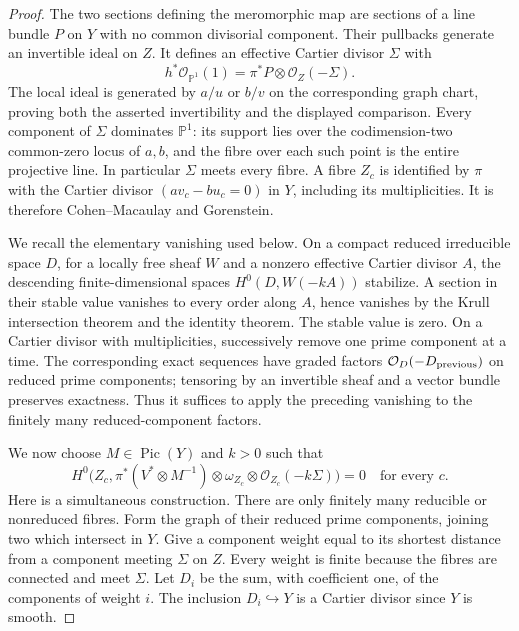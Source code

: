 \begin{proof}
The two sections defining the meromorphic map are sections of a line
bundle $P$ on $Y$ with no common divisorial component. Their pullbacks
generate an invertible ideal on $Z$. It defines an effective Cartier
divisor $\Sigma$ with
\begin{equation}\label{cdp:eq:E-graph-pencil}
 h^*\mathcal O_{\mathbb P^1}(1)=\pi^*P\otimes\mathcal O_Z(-\Sigma).
\end{equation}
The local ideal is generated by $a/u$ or $b/v$ on the corresponding
graph chart, proving both the asserted invertibility and the displayed
comparison. Every component of $\Sigma$ dominates $\mathbb P^1$:
its support lies over the codimension-two common-zero locus of $a,b$,
and the fibre over each such point is the entire projective line.
In particular $\Sigma$ meets every fibre. A fibre $Z_c$ is identified
by $\pi$ with the Cartier divisor $(a v_c-bu_c=0)$ in $Y$, including
its multiplicities. It is therefore Cohen--Macaulay and Gorenstein.

We recall the elementary vanishing used below. On a compact reduced
irreducible space $D$, for a locally free sheaf $W$ and a nonzero
effective Cartier divisor $A$, the descending finite-dimensional
spaces $H^0(D,W(-kA))$ stabilize. A section in their stable value
vanishes to every order along $A$, hence vanishes by the Krull
intersection theorem and the identity theorem. The stable value is
zero. On a Cartier divisor with multiplicities, successively remove
one prime component at a time. The corresponding exact sequences
have graded factors $\mathcal O_D(-D_{\rm previous})$ on reduced prime
components; tensoring by an invertible sheaf and a vector bundle
preserves exactness. Thus it suffices to apply the preceding vanishing
to the finitely many reduced-component factors.

We now choose $M\in\operatorname{Pic}(Y)$ and $k>0$ such that
\begin{equation}\label{cdp:eq:E-all-fibres}
 H^0\bigl(Z_c,\pi^*(V^*\otimes M^{-1})\otimes
       \omega_{Z_c}\otimes\mathcal O_{Z_c}(-k\Sigma)\bigr)=0
 \quad\text{for every }c.
\end{equation}
Here is a simultaneous construction. There are only finitely many
reducible or nonreduced fibres. Form the graph of their reduced prime
components, joining two which intersect in $Y$. Give a component
weight equal to its shortest distance from a component meeting
$\Sigma$ on $Z$. Every weight is finite because the fibres are
connected and meet $\Sigma$. Let $D_i$ be the sum, with coefficient
one, of the components of weight $i$. The inclusion $D_i\hookrightarrow
Y$ is a Cartier divisor since $Y$ is smooth.


\end{proof}
